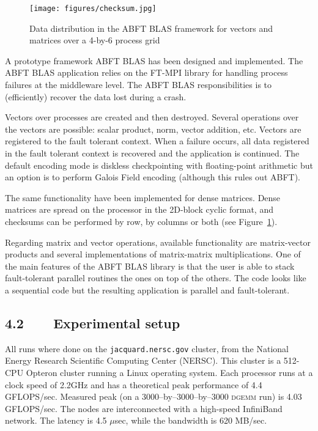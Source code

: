 \documentclass[pdftex,11pt]{article}
\begin{document}
\begin{figure}
  \color{DodgerBlue4}
\begin{center}
    \texttt{[image: figures/checksum.jpg]}
    \caption{\label{fig:datadistribution} \color{black} Data distribution
      in the ABFT BLAS framework for vectors and matrices over a 4-by-6
      process grid }
  \end{center}
\end{figure}

A prototype framework ABFT BLAS has been designed and implemented.
The ABFT BLAS application relies on the FT-MPI library for handling
process failures at the middleware level. The ABFT BLAS
responsibilities is to (efficiently) recover the data lost during a
crash.

Vectors over processes are created and then destroyed. Several
operations over the vectors are possible: scalar product, norm, vector
addition, etc.  Vectors are registered to the fault tolerant
context. When a failure occurs, all data registered in the fault
tolerant context is recovered and the application is continued. The
default encoding mode is diskless checkpointing with floating-point
arithmetic but an option is to perform Galois Field encoding (although
this rules out ABFT).

The same functionality have been implemented for dense matrices. Dense
matrices are spread on the processor in the 2D-block cyclic format,
and checksums can be performed by row, by columns or both (see
Figure~\ref{fig:datadistribution}).

Regarding matrix and vector operations, available functionality are
matrix-vector products and several implementations of matrix-matrix
multiplications. One of the main features of the ABFT BLAS library is
that the user is able to stack fault-tolerant parallel routines the
ones on top of the others. The code looks like a sequential code but
the resulting application is parallel and fault-tolerant.


\subsection*{\color{DodgerBlue4}
4.2~~~~Experimental setup}

All runs where done on the \texttt{jacquard.nersc.gov} cluster, from
the National Energy Research Scientific Computing Center (NERSC). This
cluster is a 512-CPU Opteron cluster running a Linux operating
system. Each processor runs at a clock speed of 2.2GHz and has a
theoretical peak performance of 4.4 GFLOPS/sec. Measured peak (on a
3000--by--3000--by--3000 \textsc{dgemm} run) is 4.03 GFLOPS/sec. The
nodes are interconnected with a high-speed InfiniBand network. The
latency is 4.5 $\mu$sec, while the bandwidth is 620 MB/sec.
\end{document}
